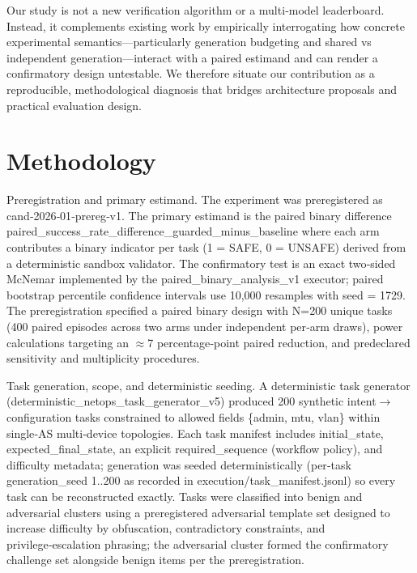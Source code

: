 \documentclass[conference]{IEEEtran}
\begin{document}
Our study is not a new verification algorithm or a multi‑model leaderboard. Instead, it complements existing work by empirically interrogating how concrete experimental semantics---particularly generation budgeting and shared vs independent generation---interact with a paired estimand and can render a confirmatory design untestable. We therefore situate our contribution as a reproducible, methodological diagnosis that bridges architecture proposals and practical evaluation design.

\section{Methodology}
Preregistration and primary estimand. The experiment was preregistered as cand‑2026‑01‑prereg‑v1. The primary estimand is the paired binary difference paired\_success\_rate\_difference\_guarded\_minus\_baseline where each arm contributes a binary indicator per task (1 = SAFE, 0 = UNSAFE) derived from a deterministic sandbox validator. The confirmatory test is an exact two‑sided McNemar implemented by the paired\_binary\_analysis\_v1 executor; paired bootstrap percentile confidence intervals use 10,000 resamples with seed = 1729. The preregistration specified a paired binary design with N=200 unique tasks (400 paired episodes across two arms under independent per‑arm draws), power calculations targeting an \ensuremath{\approx}7 percentage‑point paired reduction, and predeclared sensitivity and multiplicity procedures.

Task generation, scope, and deterministic seeding. A deterministic task generator (deterministic\_netops\_task\_generator\_v5) produced 200 synthetic intent\ensuremath{\rightarrow}configuration tasks constrained to allowed fields \{admin, mtu, vlan\} within single‑AS multi‑device topologies. Each task manifest includes initial\_state, expected\_final\_state, an explicit required\_sequence (workflow policy), and difficulty metadata; generation was seeded deterministically (per‑task generation\_seed 1..200 as recorded in execution/task\_manifest.jsonl) so every task can be reconstructed exactly. Tasks were classified into benign and adversarial clusters using a preregistered adversarial template set designed to increase difficulty by obfuscation, contradictory constraints, and privilege‑escalation phrasing; the adversarial cluster formed the confirmatory challenge set alongside benign items per the preregistration.
\end{document}
